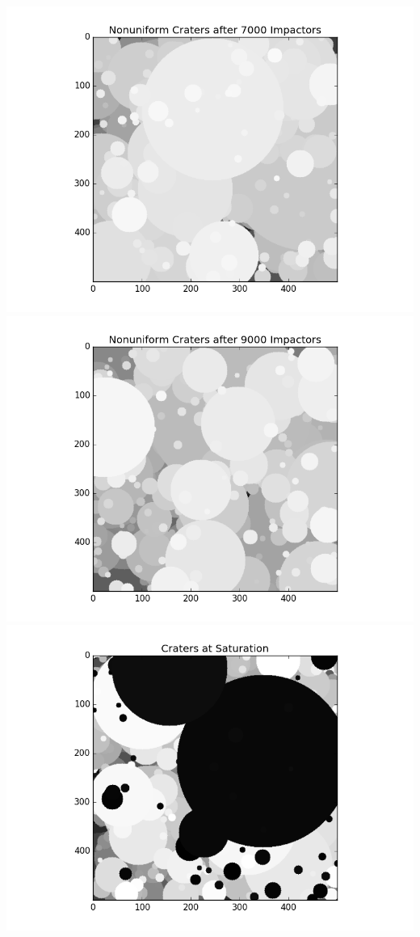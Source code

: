 \documentclass[11pt]{article}
\begin{document}
\includegraphics[scale=.4]{NonUniform7.png}\\
\includegraphics[scale=.4]{NonUniform9.png}
\includegraphics[scale=.4]{NonUniformSaturation.png}
\end{document}
